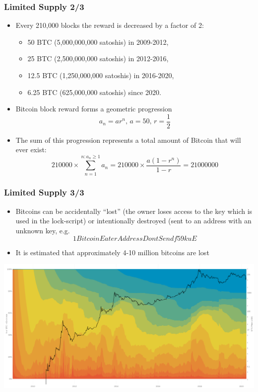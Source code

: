 \documentclass{beamer}
\begin{document}
\begin{frame}
  \frametitle{Limited Supply 2/3}
  \begin{itemize}
  \item Every 210,000 blocks the reward is decreased by a factor of 2:
    \begin{itemize}
    \item 50 BTC (5,000,000,000 satoshis) in 2009-2012,
    \item 25 BTC (2,500,000,000 satoshis) in 2012-2016,
    \item 12.5 BTC (1,250,000,000 satoshis) in 2016-2020,
    \item 6.25 BTC (625,000,000 satoshis) since 2020.
    \end{itemize}
  \item Bitcoin block reward forms a geometric progression
    $$a_n = ar^n \text{, } a = 50 \text{, } r = \frac{1}{2}$$
  \item The sum of this progression represents a total amount of Bitcoin that
    will ever exist:
    $$210000 \times \sum_{n = 1}^{n: a_n \geq 1} a_n = 210000 \times \frac{a(1 -
      r^n)}{1 - r} = 21000000$$
  \end{itemize}
\end{frame}

\begin{frame}
  \frametitle{Limited Supply 3/3}
  \begin{itemize}
    
  \item Bitcoins can be accidentally ``lost'' (the owner loses access to the key
    which is used in the lock-script) or intentionally destroyed (sent to an
    address with an unknown key, e.g.
    $$1BitcoinEaterAddressDontSendf59kuE$$
  \item It is estimated that approximately 4-10 million bitcoins are lost
  \end{itemize}
  \includegraphics[width=\textwidth]{utxo-age}
\end{frame}
\end{document}
